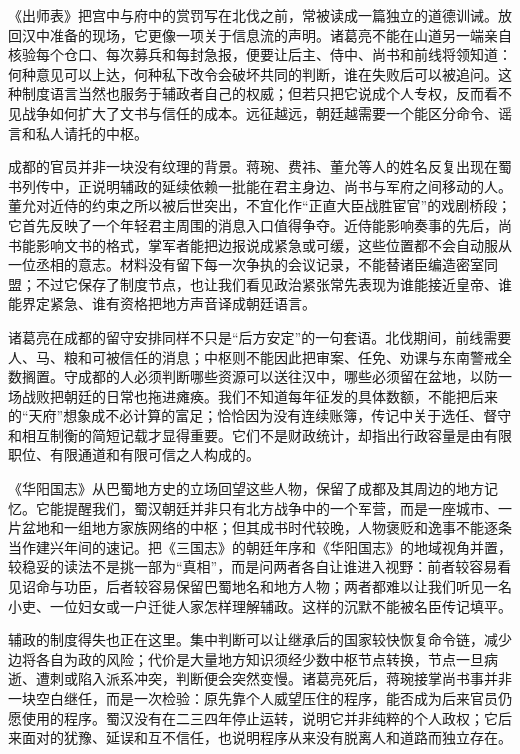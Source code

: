 《出师表》把宫中与府中的赏罚写在北伐之前，常被读成一篇独立的道德训诫。放回汉中准备的现场，它更像一项关于信息流的声明。诸葛亮不能在山道另一端亲自核验每个仓口、每次募兵和每封急报，便要让后主、侍中、尚书和前线将领知道：何种意见可以上达，何种私下改令会破坏共同的判断，谁在失败后可以被追问。这种制度语言当然也服务于辅政者自己的权威；但若只把它说成个人专权，反而看不见战争如何扩大了文书与信任的成本。远征越远，朝廷越需要一个能区分命令、谣言和私人请托的中枢。

成都的官员并非一块没有纹理的背景。蒋琬、费祎、董允等人的姓名反复出现在蜀书列传中，正说明辅政的延续依赖一批能在君主身边、尚书与军府之间移动的人。董允对近侍的约束之所以被后世突出，不宜化作“正直大臣战胜宦官”的戏剧桥段；它首先反映了一个年轻君主周围的消息入口值得争夺。近侍能影响奏事的先后，尚书能影响文书的格式，掌军者能把边报说成紧急或可缓，这些位置都不会自动服从一位丞相的意志。材料没有留下每一次争执的会议记录，不能替诸臣编造密室同盟；不过它保存了制度节点，也让我们看见政治紧张常先表现为谁能接近皇帝、谁能界定紧急、谁有资格把地方声音译成朝廷语言。

诸葛亮在成都的留守安排同样不只是“后方安定”的一句套语。北伐期间，前线需要人、马、粮和可被信任的消息；中枢则不能因此把审案、任免、劝课与东南警戒全数搁置。守成都的人必须判断哪些资源可以送往汉中，哪些必须留在盆地，以防一场战败把朝廷的日常也拖进瘫痪。我们不知道每年征发的具体数额，不能把后来的“天府”想象成不必计算的富足；恰恰因为没有连续账簿，传记中关于选任、督守和相互制衡的简短记载才显得重要。它们不是财政统计，却指出行政容量是由有限职位、有限通道和有限可信之人构成的。

《华阳国志》从巴蜀地方史的立场回望这些人物，保留了成都及其周边的地方记忆。它能提醒我们，蜀汉朝廷并非只有北方战争中的一个军营，而是一座城市、一片盆地和一组地方家族网络的中枢；但其成书时代较晚，人物褒贬和逸事不能逐条当作建兴年间的速记。把《三国志》的朝廷年序和《华阳国志》的地域视角并置，较稳妥的读法不是挑一部为“真相”，而是问两者各自让谁进入视野：前者较容易看见诏命与功臣，后者较容易保留巴蜀地名和地方人物；两者都难以让我们听见一名小吏、一位妇女或一户迁徙人家怎样理解辅政。这样的沉默不能被名臣传记填平。

辅政的制度得失也正在这里。集中判断可以让继承后的国家较快恢复命令链，减少边将各自为政的风险；代价是大量地方知识须经少数中枢节点转换，节点一旦病逝、遭刺或陷入派系冲突，判断便会突然变慢。诸葛亮死后，蒋琬接掌尚书事并非一块空白继任，而是一次检验：原先靠个人威望压住的程序，能否成为后来官员仍愿使用的程序。蜀汉没有在二三四年停止运转，说明它并非纯粹的个人政权；它后来面对的犹豫、延误和互不信任，也说明程序从来没有脱离人和道路而独立存在。

